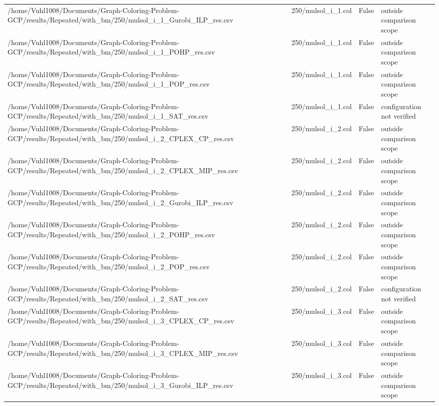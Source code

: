 \begin{table}[htbp]
\begin{tabular}{llll}
/home/Vuhl1008/Documents/Graph-Coloring-Problem-GCP/results/Repeated/with\_bm/250/mulsol\_i\_1\_Gurobi\_ILP\_res.csv & 250/mulsol\_i\_1.col & False & outside comparison scope \\
/home/Vuhl1008/Documents/Graph-Coloring-Problem-GCP/results/Repeated/with\_bm/250/mulsol\_i\_1\_POHP\_res.csv & 250/mulsol\_i\_1.col & False & outside comparison scope \\
/home/Vuhl1008/Documents/Graph-Coloring-Problem-GCP/results/Repeated/with\_bm/250/mulsol\_i\_1\_POP\_res.csv & 250/mulsol\_i\_1.col & False & outside comparison scope \\
/home/Vuhl1008/Documents/Graph-Coloring-Problem-GCP/results/Repeated/with\_bm/250/mulsol\_i\_1\_SAT\_res.csv & 250/mulsol\_i\_1.col & False & configuration not verified \\
/home/Vuhl1008/Documents/Graph-Coloring-Problem-GCP/results/Repeated/with\_bm/250/mulsol\_i\_2\_CPLEX\_CP\_res.csv & 250/mulsol\_i\_2.col & False & outside comparison scope \\
/home/Vuhl1008/Documents/Graph-Coloring-Problem-GCP/results/Repeated/with\_bm/250/mulsol\_i\_2\_CPLEX\_MIP\_res.csv & 250/mulsol\_i\_2.col & False & outside comparison scope \\
/home/Vuhl1008/Documents/Graph-Coloring-Problem-GCP/results/Repeated/with\_bm/250/mulsol\_i\_2\_Gurobi\_ILP\_res.csv & 250/mulsol\_i\_2.col & False & outside comparison scope \\
/home/Vuhl1008/Documents/Graph-Coloring-Problem-GCP/results/Repeated/with\_bm/250/mulsol\_i\_2\_POHP\_res.csv & 250/mulsol\_i\_2.col & False & outside comparison scope \\
/home/Vuhl1008/Documents/Graph-Coloring-Problem-GCP/results/Repeated/with\_bm/250/mulsol\_i\_2\_POP\_res.csv & 250/mulsol\_i\_2.col & False & outside comparison scope \\
/home/Vuhl1008/Documents/Graph-Coloring-Problem-GCP/results/Repeated/with\_bm/250/mulsol\_i\_2\_SAT\_res.csv & 250/mulsol\_i\_2.col & False & configuration not verified \\
/home/Vuhl1008/Documents/Graph-Coloring-Problem-GCP/results/Repeated/with\_bm/250/mulsol\_i\_3\_CPLEX\_CP\_res.csv & 250/mulsol\_i\_3.col & False & outside comparison scope \\
/home/Vuhl1008/Documents/Graph-Coloring-Problem-GCP/results/Repeated/with\_bm/250/mulsol\_i\_3\_CPLEX\_MIP\_res.csv & 250/mulsol\_i\_3.col & False & outside comparison scope \\
/home/Vuhl1008/Documents/Graph-Coloring-Problem-GCP/results/Repeated/with\_bm/250/mulsol\_i\_3\_Gurobi\_ILP\_res.csv & 250/mulsol\_i\_3.col & False & outside comparison scope \\

\end{tabular}
\end{table}
